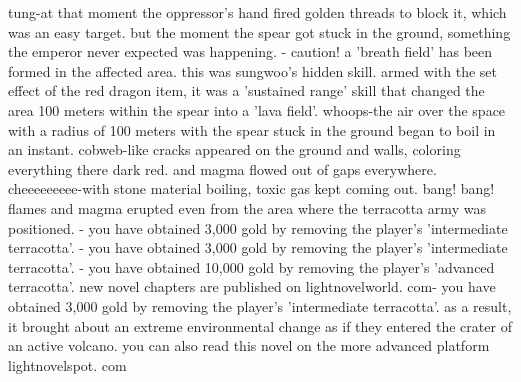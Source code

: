 tung-at that moment the oppressor's hand fired golden threads to block it, which was an easy target.
but the moment the spear got stuck in the ground, something the emperor never expected was happening.
 - caution! a 'breath field' has been formed in the affected area.
this was sungwoo's hidden skill.
 armed with the set effect of the red dragon item, it was a 'sustained range' skill that changed the area 100 meters within the spear into a 'lava field'.
whoops-the air over the space with a radius of 100 meters with the spear stuck in the ground began to boil in an instant.
 cobweb-like cracks appeared on the ground and walls, coloring everything there dark red.
 and magma flowed out of gaps everywhere.
 cheeeeeeeee-with stone material boiling, toxic gas kept coming out.
 bang! bang! flames and magma erupted even from the area where the terracotta army was positioned.
 - you have obtained 3,000 gold by removing the player's 'intermediate terracotta'.
- you have obtained 3,000 gold by removing the player's 'intermediate terracotta'.
- you have obtained 10,000 gold by removing the player's 'advanced terracotta'.
new novel chapters are published on lightnovelworld.
com- you have obtained 3,000 gold by removing the player's 'intermediate terracotta'.
as a result, it brought about an extreme environmental change as if they entered the crater of an active volcano.
 you can also read this novel on the more advanced platform lightnovelspot.
com

 